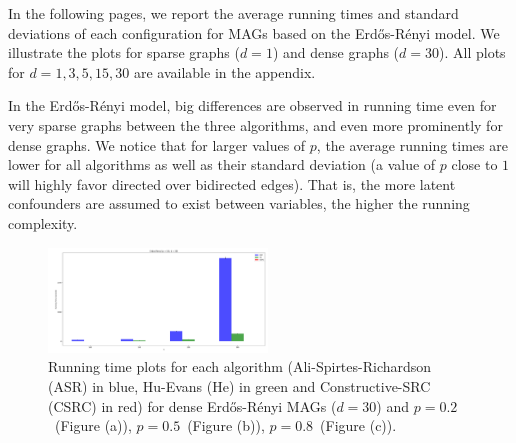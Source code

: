 \documentclass[a4paper]{article}
\begin{document}
In the following pages, we report the average running times and standard deviations of each configuration for MAGs based on the Erd\H{o}s-R\'{e}nyi model. We illustrate the plots for sparse graphs ($d=1$) and dense graphs ($d=30$). All plots for $d=1,3,5,15,30$ are available in the appendix. 

In the Erd\H{o}s-R\'{e}nyi model, big differences are observed in running time even for very sparse graphs between the three algorithms, and even more prominently for dense graphs. We notice that for larger values of $p$, the average running times are lower for all algorithms as well as their standard deviation (a value of $p$ close to $1$ will highly favor directed over bidirected edges). That is, the more latent confounders are assumed to exist between variables, the higher the running complexity.


\begin{figure}[htbp]
	\centering
	\hfill
	
	\includegraphics[width=0.52\textwidth]{figures/Figure_15.png}
	
	\caption{Running time plots for each algorithm (Ali-Spirtes-Richardson (ASR) in blue, Hu-Evans (He) in green and Constructive-SRC (CSRC) in red) for dense Erd\H{o}s-R\'{e}nyi MAGs ($d=30$) and $p=0.2$~(Figure (a)), $p=0.5$~(Figure (b)), $p=0.8$~(Figure (c)).}
	\label{fig:er-30}
\end{figure}
\end{document}
